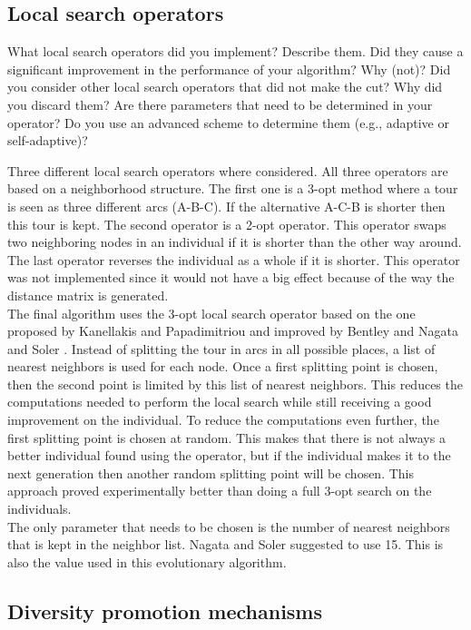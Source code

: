 \documentclass[a4paper,10pt]{article}
\newcommand{\ReplaceMe}[1]{{\color{blue}#1}}
\begin{document}
\subsection{Local search operators}

\ReplaceMe{What local search operators did you implement? Describe them. Did they cause a significant improvement in the performance of your algorithm? Why (not)? Did you consider other local search operators that did not make the cut? Why did you discard them? Are there parameters that need to be determined in your operator? Do you use an advanced scheme to determine them (e.g., adaptive or self-adaptive)?}

Three different local search operators where considered. All three operators are based on a neighborhood structure. The first one is a 3-opt method where a tour is seen as three different arcs (A-B-C). If the alternative A-C-B is shorter then this tour is kept. The second operator is a 2-opt operator. This operator swaps two neighboring nodes in an individual if it is shorter than the other way around. The last operator reverses the individual as a whole if it is shorter. This operator was not implemented since it would not have a big effect because of the way the distance matrix is generated.\\
The final algorithm uses the 3-opt local search operator based on the one proposed by Kanellakis and Papadimitriou \cite{kanellakispapadimitriou} and improved by Bentley \cite{bentley} and Nagata and Soler \cite{nagatasoler}. Instead of splitting the tour in arcs in all possible places, a list of nearest neighbors is used for each node. Once a first splitting point is chosen, then the second point is limited by this list of nearest neighbors. This reduces the computations needed to perform the local search while still receiving a good improvement on the individual. To reduce the computations even further, the first splitting point is chosen at random. This makes that there is not always a better individual found using the operator, but if the individual makes it to the next generation then another random splitting point will be chosen. This approach proved experimentally better than doing a full 3-opt search on the individuals.\\
The only parameter that needs to be chosen is the number of nearest neighbors that is kept in the neighbor list. Nagata and Soler suggested to use 15. This is also the value used in this evolutionary algorithm. 

\subsection{Diversity promotion mechanisms} \label{sec:diversity}
\end{document}
